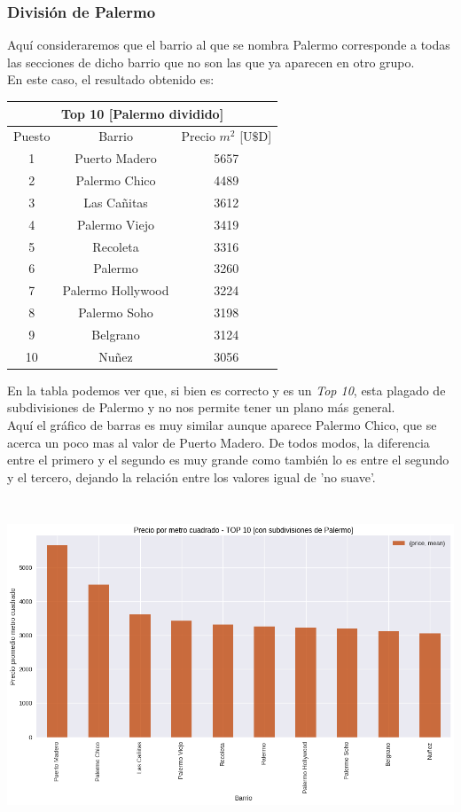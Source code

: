 \documentclass[a4paper, 10pt]{article}
\newcommand\tab[1][0.5cm]{\hspace*{#1}}
\begin{document}
			  	\subsubsection{División de Palermo}
			  		Aquí consideraremos que el barrio al que se nombra Palermo corresponde a todas las secciones de dicho
			  		barrio que no son las que ya aparecen en otro grupo. \\
			  		\tab En este caso, el resultado obtenido es:
			  		\begin{center}
						\begin{tabular}{ |c|c|c| }
							\hline
							\multicolumn{3}{|c|}{Top 10 [Palermo dividido]}\\
							\hline
							\hline
							Puesto & Barrio & Precio $m^2$ [U$\$$D] \\
							\hline
							1 & Puerto Madero & 5657 \\
							2 & Palermo Chico & 4489 \\
							3 & Las Cañitas & 3612  \\
							4 & Palermo Viejo & 3419 \\
							5 & Recoleta & 3316 \\
							6 & Palermo & 3260 \\
							7 & Palermo Hollywood & 3224 \\
							8 & Palermo Soho & 3198 \\
							9 & Belgrano & 3124 \\
							10 & Nuñez & 3056 \\
							\hline
						\end{tabular}
					\end{center}
					\tab En la tabla podemos ver que, si bien es correcto y es un \emph{Top 10}, esta plagado de subdivisiones
					de Palermo y no nos permite tener un plano más general. \\
					\tab Aquí el gráfico de barras es muy similar aunque aparece Palermo Chico, que se acerca un poco mas
					al valor de Puerto Madero. De todos modos, la diferencia entre el primero y el segundo es muy grande
					como también lo es entre el segundo y el tercero, dejando la relación entre los valores igual de 'no suave'.
					\begin{center}
   	    					\includegraphics[width=6in, height=3.9in]{images/m2NotUnifiedTop10}
			  		\end{center}
\end{document}
